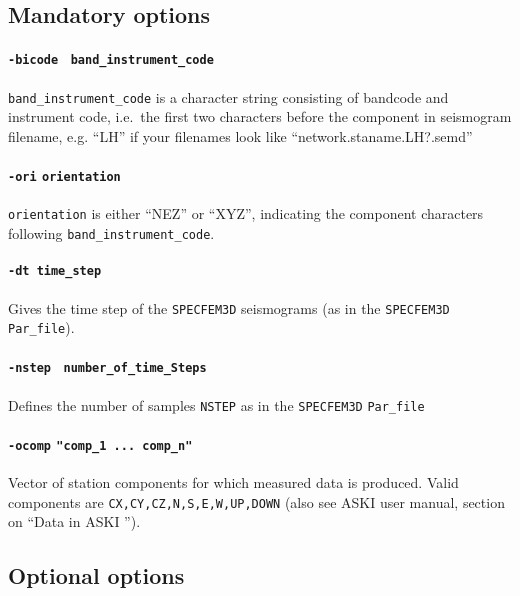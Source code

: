 \documentclass[12pt,a4paper]{article}
\newcommand{\lcode}[1]{\nolinkurl{#1}}
\newcommand{\ASKI}{ {\ttfamily ASKI} }
\begin{document}
\subsection*{Mandatory options}
\paragraph{\lcode{-bicode} \lcode{ band_instrument_code}}
\lcode{band_instrument_code} is a character string consisting of bandcode and instrument code, i.e.\ 
the first two characters before the component in seismogram filename, e.g. ``LH'' if your filenames 
look like ``network.staname.LH?.semd''

\paragraph{\lcode{-ori} \lcode{orientation}}
\lcode{orientation} is either ``NEZ'' or ``XYZ'', indicating the component characters following 
\lcode{band_instrument_code}.

\paragraph{\lcode{-dt time_step}}
Gives the time step of the \lcode{SPECFEM3D} seismograms (as in the \lcode{SPECFEM3D} \lcode{Par_file}).

\paragraph{\lcode{-nstep} \lcode{ number_of_time_Steps}}
Defines the number of samples \lcode{NSTEP} as in the \lcode{SPECFEM3D} \lcode{Par_file}

\paragraph{\lcode{-ocomp} \lcode{"comp_1 ... comp_n"}}
Vector of station components for which measured data is produced. Valid components are
\lcode{CX,CY,CZ,N,S,E,W,UP,DOWN}
(also see \ASKI{} user manual, section on ``Data in \ASKI{}'').


\subsection*{Optional options}
\end{document}
